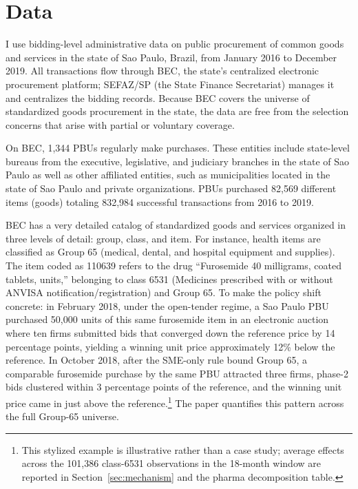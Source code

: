 \section{Data}

I use bidding-level administrative data on public procurement of common goods and services in the state of Sao Paulo, Brazil, from January 2016 to December 2019. All transactions flow through BEC, the state's centralized electronic procurement platform; SEFAZ/SP (the State Finance Secretariat) manages it and centralizes the bidding records. Because BEC covers the universe of standardized goods procurement in the state, the data are free from the selection concerns that arise with partial or voluntary coverage.

On BEC, 1,344 PBUs regularly make purchases. These entities include state-level bureaus from the executive, legislative, and judiciary branches in the state of Sao Paulo as well as other affiliated entities, such as municipalities located in the state of Sao Paulo and private organizations. PBUs purchased 82,569 different items (goods) totaling 832,984 successful transactions from 2016 to 2019.

BEC has a very detailed catalog of standardized goods and services organized in three levels of detail: group, class, and item. For instance, health items are classified as Group 65 (medical, dental, and hospital equipment and supplies). The item coded as 110639 refers to the drug ``Furosemide 40 milligrams, coated tablets, units,'' belonging to class 6531 (Medicines prescribed with or without ANVISA notification/registration) and Group 65. To make the policy shift concrete: in February 2018, under the open-tender regime, a Sao Paulo PBU purchased 50{,}000 units of this same furosemide item in an electronic auction where ten firms submitted bids that converged down the reference price by 14 percentage points, yielding a winning unit price approximately 12\% below the reference. In October 2018, after the SME-only rule bound Group 65, a comparable furosemide purchase by the same PBU attracted three firms, phase-2 bids clustered within 3 percentage points of the reference, and the winning unit price came in just above the reference.\footnote{This stylized example is illustrative rather than a case study; average effects across the 101{,}386 class-6531 observations in the 18-month window are reported in Section~\ref{sec:mechanism} and the pharma decomposition table.} The paper quantifies this pattern across the full Group-65 universe.

